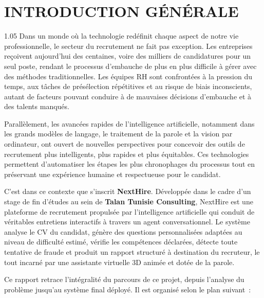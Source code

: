 \chapter*{INTRODUCTION GÉNÉRALE}
\adjustmtc%
\thispagestyle{MyStyle}

\begin{spacing}{1.05}
Dans un monde où la technologie redéfinit chaque aspect de notre vie professionnelle, le
secteur du recrutement ne fait pas exception. Les entreprises reçoivent aujourd'hui des
centaines, voire des milliers de candidatures pour un seul poste, rendant le processus
d'embauche de plus en plus difficile à gérer avec des méthodes traditionnelles. Les équipes
RH sont confrontées à la pression du temps, aux tâches de présélection répétitives et au
risque de biais inconscients, autant de facteurs pouvant conduire à de mauvaises décisions
d'embauche et à des talents manqués.

Parallèlement, les avancées rapides de l'intelligence artificielle, notamment dans les grands
modèles de langage, le traitement de la parole et la vision par ordinateur, ont ouvert de
nouvelles perspectives pour concevoir des outils de recrutement plus intelligents, plus rapides
et plus équitables. Ces technologies permettent d'automatiser les étapes les plus chronophages
du processus tout en préservant une expérience humaine et respectueuse pour le candidat.

C'est dans ce contexte que s'inscrit \textbf{NextHire}. Développée dans le cadre d'un stage
de fin d'études au sein de \textbf{Talan Tunisie Consulting}, NextHire est une plateforme de
recrutement propulsée par l'intelligence artificielle qui conduit de véritables entretiens
interactifs à travers un agent conversationnel. Le système analyse le CV du candidat, génère
des questions personnalisées adaptées au niveau de difficulté estimé, vérifie les compétences
déclarées, détecte toute tentative de fraude et produit un rapport structuré à destination du
recruteur, le tout incarné par une assistante virtuelle 3D animée et dotée de la parole.

Ce rapport retrace l'intégralité du parcours de ce projet, depuis l'analyse du problème
jusqu'au système final déployé. Il est organisé selon le plan suivant~:


\end{spacing}
